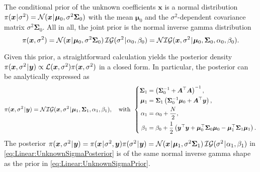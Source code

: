 The conditional prior of the unknown coefficients \(\bm{x}\) is a normal distribution \(\pi(\bm{x} {\:\!}|{\:\!} \sigma^2) = \mathcal{N}(\bm{x} {\:\!}|{\:\!} \bm{\mu}_0, \sigma^2 \bm{\Sigma}_0)\)
with the mean \(\bm{\mu}_0\) and the \(\sigma^2\)-dependent covariance matrix \(\sigma^2 \bm{\Sigma}_0\).
All in all, the joint prior is the normal inverse gamma distribution
\begin{equation} \label{eq:Linear:UnknownSigmaPrior}
  \pi(\bm{x},\sigma^2)
  = \mathcal{N}(\bm{x} {\:\!}|{\:\!} \bm{\mu}_0, \sigma^2 \bm{\Sigma}_0) \, \mathcal{IG}(\sigma^2 {\:\!}|{\:\!} \alpha_0,\beta_0)
  = \mathcal{NIG}(\bm{x},\sigma^2 {\:\!}|{\:\!} \bm{\mu}_0,\bm{\Sigma}_0,\alpha_0,\beta_0).
\end{equation}
\par %
Given this prior, a straightforward calculation yields the posterior density \(\pi(\bm{x},\sigma^2 {\:\!}|{\:\!} \bm{y}) \propto \mathcal{L}(\bm{x},\sigma^2) \pi(\bm{x},\sigma^2)\) in a closed form.
In particular, the posterior can be analytically expressed as
\begin{equation} \label{eq:Linear:UnknownSigmaPosterior}
  \pi(\bm{x},\sigma^2 {\:\!}|{\:\!} \bm{y}) = \mathcal{NIG}(\bm{x},\sigma^2 {\:\!}|{\:\!} \bm{\mu}_1,\bm{\Sigma}_1,\alpha_1,\beta_1), \quad \text{with} \;\,
  \left\{
  \begin{aligned}
    \bm{\Sigma}_1 &= \left( \bm{\Sigma}_0^{-1} + \bm{A}^\top \bm{A} \right)^{-1}, \\
    \bm{\mu}_1 &= \bm{\Sigma}_1 \left( \bm{\Sigma}_0^{-1} \bm{\mu}_0 + \bm{A}^\top \bm{y} \right), \\
    \alpha_1 &= \alpha_0 + \frac{N}{2}, \\
    \beta_1 &= \beta_0 + \frac{1}{2} \left( \bm{y}^\top \bm{y} + \bm{\mu}_0^\top \bm{\Sigma}_0 \bm{\mu}_0 - \bm{\mu}_1^\top \bm{\Sigma}_1 \bm{\mu}_1 \right).
  \end{aligned}
  \right.
\end{equation}
The posterior \(\pi(\bm{x},\sigma^2 \cond \bm{y}) = \pi(\bm{x} \cond \sigma^2,\bm{y}) \pi(\sigma^2 \cond \bm{y})
= \mathcal{N}(\bm{x} \cond \bm{\mu}_1, \sigma^2 \bm{\Sigma}_1) \, \mathcal{IG}(\sigma^2 \cond \alpha_1,\beta_1)\)
in \cref{eq:Linear:UnknownSigmaPosterior} is of the same normal inverse gamma shape as the prior in \cref{eq:Linear:UnknownSigmaPrior}.

